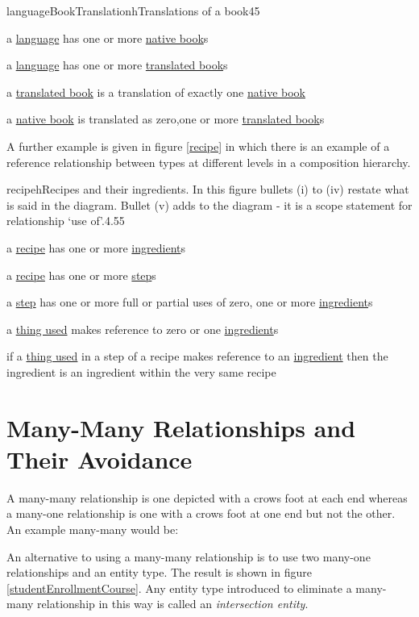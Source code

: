 \begin{erbulletedDimFig}{languageBookTranslation}{h}{Translations of a book}{4}{5}
\item{a \underline{language} has one or more \underline{native book}s}
\item{a \underline{language} has one or more \underline{translated book}s}
\item{a \underline{translated book} is a translation of exactly one \underline{native book}}
\item{a \underline{native book} is translated as  zero,one or more \underline{translated book}s}
\end{erbulletedDimFig} 


\noindent A further example is given in figure \ref{recipe} in which there is an example of a reference relationship between types at different levels in a composition hierarchy.\\
\begin{erbulletedDimFig}{recipe}{h}{Recipes and their ingredients. In this figure bullets (i) to (iv) restate what is said in the diagram. Bullet (v) adds to the diagram - it is a scope statement for relationship `use of'.}{4.5}{5}
\item{a \underline{recipe} has one or more \underline{ingredient}s}
\item{a \underline{recipe} has one or more \underline{step}s}
\item{a \underline{step} has one or more full or partial uses of zero, one or more \underline{ingredient}s}
\item{a \underline{thing used} makes reference to zero or one \underline{ingredient}s}
\item{if a \underline{thing used} in a step of a recipe makes reference to an \underline{ingredient} then the ingredient is an ingredient within the very same recipe}
\end{erbulletedDimFig} 


\section{Many-Many Relationships and Their Avoidance}

A many-many relationship is one depicted with a crows foot at each end whereas a many-one relationship is one with a crows foot at one end but not the other.
An example many-many would be:

\noindent An alternative to using a many-many relationship is to use two many-one relationships and an entity type. The result is shown in figure \ref{studentEnrollmentCourse}. Any entity type introduced to eliminate a many-many relationship in this way is called an \textit{intersection entity}. \\

